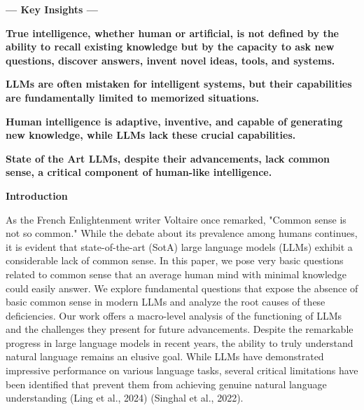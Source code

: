 \documentclass[11pt]{scrartcl}
\begin{document}
\vspace{1cm}

\begin{center}
\begin{huge}
\textbf{— Key Insights —}
\end{huge}
\end{center}

\begin{itemize}
\begin{large}
    \item \textbf{True intelligence, whether human or artificial, is not defined by the ability to recall existing knowledge but by the capacity to ask new questions, discover answers, invent novel ideas, tools, and systems.}
    \item \textbf{LLMs are often mistaken for intelligent systems, but their capabilities are fundamentally limited to memorized situations.}
    \item \textbf{Human intelligence is adaptive, inventive, and capable of generating new knowledge, while LLMs lack these crucial capabilities.}
    	\item \textbf{State of the Art LLMs, despite their advancements, lack common sense, a critical component of human-like intelligence.}
\end{large}
\end{itemize}

\vspace{1cm}

\begin{huge}
\textbf{Introduction}
\end{huge}
As the French Enlightenment writer Voltaire once remarked, "Common sense is not so common." While the debate about its prevalence among humans continues, it is evident that state-of-the-art (SotA) large language models (LLMs) exhibit a considerable lack of common sense. In this paper, we pose very basic questions related to common sense that an average human mind with minimal knowledge could easily answer. We explore fundamental questions that expose the absence of basic common sense in modern LLMs and analyze the root causes of these deficiencies. Our work offers a macro-level analysis of the functioning of LLMs and the challenges they present for future advancements. Despite the remarkable progress in large language models in recent years, the ability to truly understand natural language remains an elusive goal. While LLMs have demonstrated impressive performance on various language tasks, several critical limitations have been identified that prevent them from achieving genuine natural language understanding (Ling et al., 2024)\cite{ref6} (Singhal et al., 2022)\cite{ref7}. \\
\end{document}
